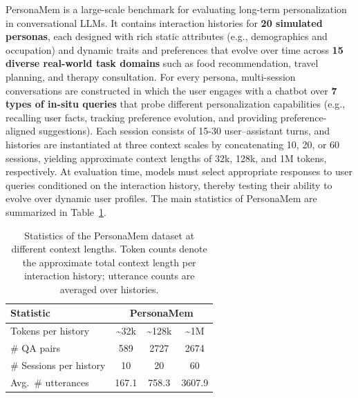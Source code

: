 PersonaMem \cite{personamem} is a large-scale benchmark for evaluating long-term personalization in conversational LLMs. It contains interaction histories for \textbf{20 simulated personas}, each designed with rich static attributes (e.g., demographics and occupation) and dynamic traits and preferences that evolve over time across \textbf{15 diverse real-world task domains} such as food recommendation, travel planning, and therapy consultation. For every persona, multi-session conversations are constructed in which the user engages with a chatbot over \textbf{7 types of in-situ queries} that probe different personalization capabilities (e.g., recalling user facts, tracking preference evolution, and providing preference-aligned suggestions). Each session consists of 15-30 user–assistant turns, and histories are instantiated at three context scales by concatenating 10, 20, or 60 sessions, yielding approximate context lengths of 32k, 128k, and 1M tokens, respectively. At evaluation time, models must select appropriate responses to user queries conditioned on the interaction history, thereby testing their ability to evolve over dynamic user profiles. The main statistics of PersonaMem are summarized in Table~\ref{tab:personamem-stats}.

\begin{table}[t]
\setlength{\tabcolsep}{4pt}
  \centering
  \begin{tabular}{lccc}
    \toprule
    \textbf{Statistic} & \multicolumn{3}{c}{\textbf{PersonaMem}} \\
    \midrule
    Tokens per history        & \textasciitilde 32k   & \textasciitilde 128k  & \textasciitilde 1M     \\
    \# QA pairs               & 589   & 2727  & 2674   \\
    \# Sessions per history   & 10    & 20    & 60     \\
    Avg.\ \# utterances       & 167.1 & 758.3 & 3607.9 \\
    \bottomrule
  \end{tabular}
  \caption{Statistics of the PersonaMem dataset at different context lengths. Token counts denote the approximate total context length per interaction history; utterance counts are averaged over histories.}
  \label{tab:personamem-stats}
\end{table}

